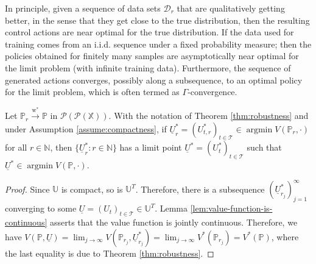 \documentclass[11pt]{article}
\newcommand{\NN}{\mathbb{N}}
\newcommand{\XX}{\mathbb{X}}
\newcommand{\UU}{\mathbb{U}}
\newcommand{\PP}{\mathbb{P}}
\newcommand{\cD}{\mathcal{D}}
\newcommand{\cP}{\mathcal{P}}
\newcommand{\cT}{\mathcal{T}}
\newcommand{\argmin}{\operatorname{argmin}}
\begin{document}
In principle, given a sequence of data sets $\cD_r$ that are qualitatively getting better, in the sense that they get close to the true distribution, then the resulting control actions are near optimal for the true distribution. If the data used for training comes from an i.i.d. sequence under a fixed probability measure; then the policies obtained for finitely many samples are asymptotically near optimal for the limit problem (with infinite training data). Furthermore, the sequence of generated actions converges, possibly along a subsequence, to an optimal policy for the limit problem, which is often termed as $\Gamma$-convergence.
\begin{corollary}
    Let $\PP_r\xrightarrow{\mathrm{w}^*} \PP$ in $\cP(\cP(\XX))$. With the notation of Theorem \ref{thm:robustness} and under Assumption \ref{assume:compactness}, if $\underline{U}_r^* = (U_{t,r}^*)_{t\in\cT} \in \argmin V(\PP_r, \cdot)$ for all $r\in\NN$, then $\{\underline{U}_r^* : r\in\NN\}$ has a limit point $\underline{U}^* = (U_t^*)_{t\in\cT}$ such that $\underline{U}^* \in \argmin V(\PP, \cdot)$.
\end{corollary}
\begin{proof}
Since $\UU$ is compact, so is $\UU^T$. Therefore, there is a subsequence $(\underline{U}_{r_j}^*)_{j=1}^\infty$ converging to some $\underline{U} = (U_t)_{t\in\cT} \in \UU^T$. Lemma \ref{lem:value-function-is-continuous} asserts that the value function is jointly continuous. Therefore, we have $V(\PP, \underline{U}) = \lim_{j\to\infty}V(\PP_{r_j}, \underline{U}_{r_j}^*) = \lim_{j\to\infty}V^*(\PP_{r_j}) = V^*(\PP)$, where the last equality is due to Theorem \ref{thm:robustness}.
\end{proof}
\end{document}
